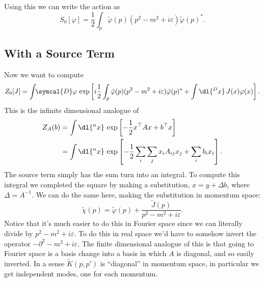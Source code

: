 \documentclass[fleqn]{NotesClass}
\newcommand{\dalembertian}{\partial^2}
\newcommand{\trans}{{\top}}
\newcommand{\DL}[1]{\symcal{D}#1}
\begin{document}
    Using this we can write the action as
    \begin{equation}
        S_0[\varphi] = \frac{1}{2} \int_p \tilde{\varphi}(p)(p^2 - m^2 + i\varepsilon) \tilde{\varphi}(p)^*.
    \end{equation}
    
    \subsection{With a Source Term}
    Now we want to compute
    \begin{equation}
        Z_0[J] = \int \!\! \DL{\varphi} \, \exp\left[  i\frac{1}{2} \int_p \tilde{\varphi}(p)(p^2 - m^2 + i\varepsilon) \tilde{\varphi}(p)^* + \int \dl{^Dx} \, J(x) \varphi(x) \right].
    \end{equation}
    This is the infinite dimensional analogue of
    \begin{align}
        Z_A(b) &= \int \dl{^nx} \, \exp\left[ -\frac{1}{2}x^\trans A x + b^\trans x \right]\\
        &= \int \dl{^nx} \, \exp\left[ -\frac{1}{2}\sum_i\sum_j x_iA_{ij}x_j + \sum_i b_ix_i \right].
    \end{align}
    The source term simply has the sum turn into an integral.
    To compute this integral we completed the square by making a substitution, \(x = y + \Delta b\), where \(\Delta = A^{-1}\).
    We can do the same here, making the substitution in momentum space:
    \begin{equation}
        \tilde{\chi}(p) = \tilde{\varphi}(p) + \frac{\tilde{J}(p)}{p^2 - m^2 + i\varepsilon}.
    \end{equation}
    Notice that it's much easier to do this in Fourier space since we can literally divide by \(p^2 - m^2 + i\varepsilon\).
    To do this in real space we'd have to somehow invert the operator \(-\dalembertian - m^2 + i\varepsilon\).
    The finite dimensional analogue of this is that going to Fourier space is a basis change into a basis in which \(A\) is diagonal, and so easily inverted.
    In a sense \(\tilde{K}(p, p')\) is \enquote{diagonal} in momentum space, in particular we get independent modes, one for each momentum.
    
\end{document}
